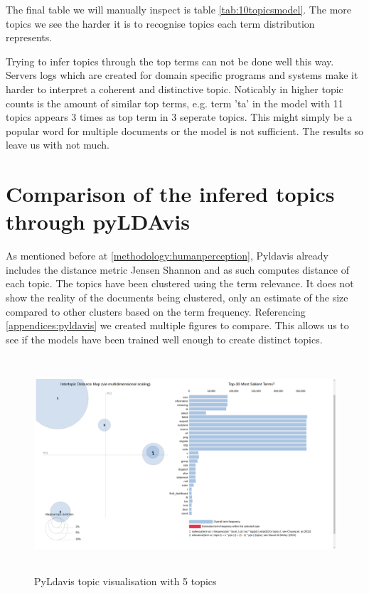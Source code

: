The final table we will manually inspect is table \ref{tab:10topicsmodel}. The more topics we see the harder it is to recognise topics each term distribution represents. 

Trying to infer topics through the top terms can not be done well this way. Servers logs which are created for domain specific programs and systems make it harder to interpret a coherent and distinctive topic. Noticably in higher topic counts is the amount of similar top terms, e.g. term 'ta' in the model with 11 topics appears 3 times as top term in 3 seperate topics. This might simply be a popular word for multiple documents or the model is not sufficient. The results so leave us with not much. 

\FloatBarrier
\section{Comparison of the infered topics through pyLDAvis}\label{results:pyldavis}
As mentioned before at \ref{methodology:humanperception}, Pyldavis already includes the distance metric Jensen Shannon and as such computes distance of each topic. The topics have been clustered using the term relevance. It does not show the reality of the documents being clustered, only an estimate of the size compared to other clusters based on the term frequency. Referencing \ref{appendices:pyldavis} we created multiple figures to compare. This allows us to see if the models have been trained well enough to create distinct topics.

\begin{figure}[h]
    \centering
    \includegraphics[width=15cm, height=8cm,trim=0 0 100px 0, clip=true]{figures/pyldavis/pyldavis_5.png}
    \caption{PyLdavis topic visualisation with 5 topics}
    \label{fig:pyldavis_5}
\end{figure}

